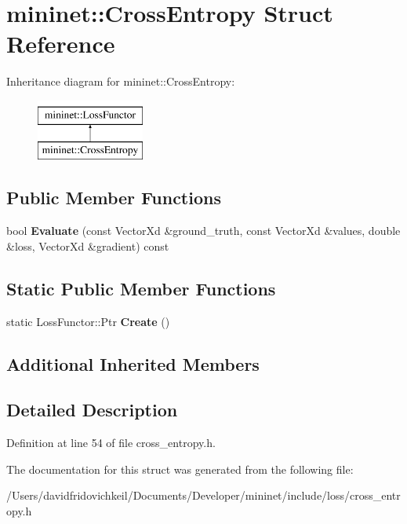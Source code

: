 \hypertarget{structmininet_1_1_cross_entropy}{}\section{mininet\+:\+:Cross\+Entropy Struct Reference}
\label{structmininet_1_1_cross_entropy}
Inheritance diagram for mininet\+:\+:Cross\+Entropy\+:\begin{figure}[H]
\begin{center}
\leavevmode
\includegraphics[height=2.000000cm]{structmininet_1_1_cross_entropy}
\end{center}
\end{figure}
\subsection*{Public Member Functions}
\begin{DoxyCompactItemize}
\item 
\hypertarget{structmininet_1_1_cross_entropy_af0d203db733d96a1c7eb4c6d0f7d51e5}{}\label{structmininet_1_1_cross_entropy_af0d203db733d96a1c7eb4c6d0f7d51e5} 
bool {\bfseries Evaluate} (const Vector\+Xd \&ground\+\_\+truth, const Vector\+Xd \&values, double \&loss, Vector\+Xd \&gradient) const
\end{DoxyCompactItemize}
\subsection*{Static Public Member Functions}
\begin{DoxyCompactItemize}
\item 
\hypertarget{structmininet_1_1_cross_entropy_ae736386755ec56b1adfaf643b1d114fa}{}\label{structmininet_1_1_cross_entropy_ae736386755ec56b1adfaf643b1d114fa} 
static Loss\+Functor\+::\+Ptr {\bfseries Create} ()
\end{DoxyCompactItemize}
\subsection*{Additional Inherited Members}


\subsection{Detailed Description}


Definition at line 54 of file cross\+\_\+entropy.\+h.



The documentation for this struct was generated from the following file\+:\begin{DoxyCompactItemize}
\item 
/\+Users/davidfridovichkeil/\+Documents/\+Developer/mininet/include/loss/cross\+\_\+entropy.\+h\end{DoxyCompactItemize}
